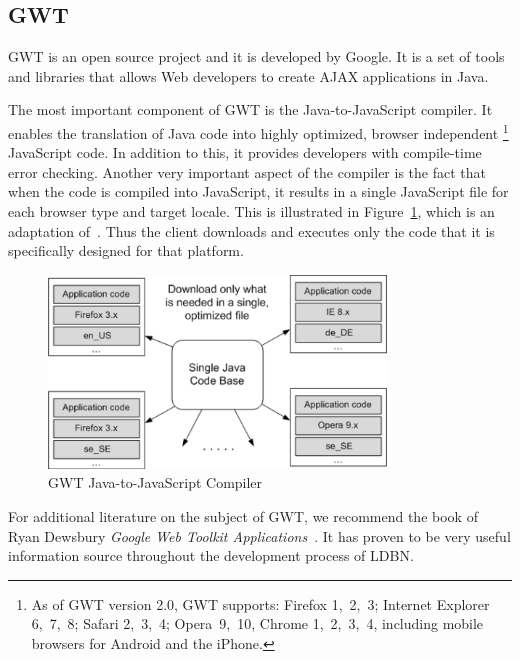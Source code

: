 \subsection{GWT}
\label{sec:gwt}

GWT is an open source project
and it is developed by Google. It is a set of tools and libraries that allows Web developers to
create AJAX applications in Java. 

The most important component of GWT is the Java-to-JavaScript compiler. It enables the
translation of Java code into highly optimized, browser independent
\footnote{As of GWT version 2.0, GWT supports: 
Firefox 1,~2,~3; Internet Explorer 6,~7,~8; Safari 2,~3,~4; Opera~9,~10, Chrome 1,~2,~3,~4, including mobile browsers for Android and the iPhone.} 
JavaScript code.
In addition to this, it provides developers with compile-time error checking. Another
very important aspect of the compiler is the fact that when the code is compiled into
JavaScript, it results in a single JavaScript file for each browser type and target locale.
This is illustrated in Figure~\ref{fig:gwt01}, which is an adaptation of~\cite[Figure 7]{wgio2}. 
Thus the client downloads and executes only the code that it is specifically designed for that platform.  

\begin{figure}[h]
	\begin{center}
		\includegraphics[width=0.8\textwidth]{./img/gwt01a.png}
		\caption{GWT Java-to-JavaScript Compiler}
		\label{fig:gwt01}
	\end{center}
\end{figure}

For additional literature on the subject of GWT, we recommend the book of 
Ryan Dewsbury \textit{Google Web Toolkit Applications}~\cite{bgwt2}. It has
proven to be very useful information source throughout the development process 
of LDBN. 

